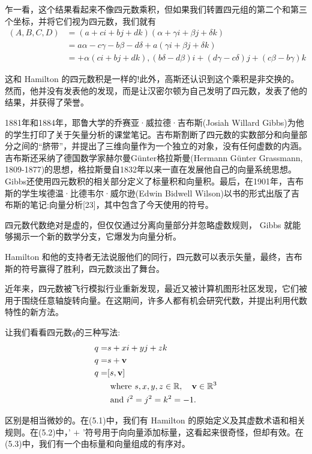 乍一看，这个结果看起来不像四元数乘积，但如果我们转置四元组的第二个和第三个坐标，并将它们视为四元数，我们就有
$$
\begin{aligned}
(A, B, C, D) & =(a+c i+b j+d k)(\alpha+\gamma i+\beta j+\delta k) \\
& =a \alpha-c \gamma-b \beta-d \delta+a(\gamma i+\beta j+\delta k) \\
& =+\alpha(c i+b j+d k),(b \delta-d \beta) i+(d \gamma-c \delta) j+(c \beta-b \gamma) k
\end{aligned}
$$

这和 Hamilton 的四元数积是一样的!此外，高斯还认识到这个乘积是非交换的。然而，他并没有发表他的发现，而是让汉密尔顿为自己发明了四元数，发表了他的结果，并获得了荣誉。

1881年和1884年，耶鲁大学的乔赛亚·威拉德·吉布斯(Josiah Willard Gibbs)为他的学生打印了关于矢量分析的课堂笔记。吉布斯割断了四元数的实数部分和向量部分之间的“脐带”，并提出了三维向量作为一个独立的对象，没有任何虚数的内涵。吉布斯还采纳了德国数学家赫尔曼Günter格拉斯曼(Hermann Günter Grassmann, 1809-1877)的思想，格拉斯曼自1832年以来一直在发展他自己的向量系统思想。Gibbs还使用四元数积的相关部分定义了标量积和向量积。最后，在1901年，吉布斯的学生埃德温·比德韦尔·威尔逊(Edwin Bidwell Wilson)以书的形式出版了吉布斯的笔记:向量分析[23]，其中包含了今天使用的符号。

四元数代数绝对是虚的，但仅仅通过分离向量部分并忽略虚数规则， Gibbs 就能够揭示一个新的数学分支，它爆发为向量分析。

Hamilton 和他的支持者无法说服他们的同行，四元数可以表示矢量，最终，吉布斯的符号赢得了胜利，四元数淡出了舞台。

近年来，四元数被飞行模拟行业重新发现，最近又被计算机图形社区发现，它们被用于围绕任意轴旋转向量。在这期间，许多人都有机会研究代数，并提出利用代数特性的新方法。

让我们看看四元数$q$的三种写法:
\begin{align}
q= & s+x i+y j+z k \\
q= & s+\mathbf{v} \\
q= & {[s, \mathbf{v}] } \\
& \text { where } s, x, y, z \in \mathbb{R}, \quad \mathbf{v} \in \mathbb{R}^{3} \notag\\
& \text { and } i^{2}=j^{2}=k^{2}=-1 .\notag
\end{align}

区别是相当微妙的。在(5.1)中，我们有 Hamilton 的原始定义及其虚数术语和相关规则。在(5.2)中，' $+$ '符号用于向向量添加标量，这看起来很奇怪，但却有效。在(5.3)中，我们有一个由标量和向量组成的有序对。


